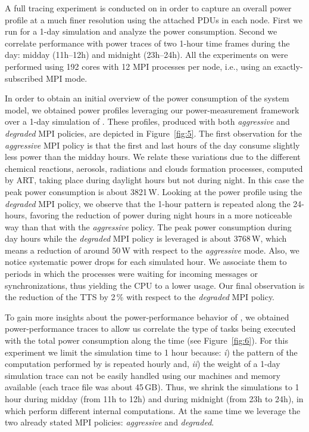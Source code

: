 A full tracing  experiment is conducted on \tinto  in order to capture
an overall power profile at a much finer resolution using the attached
PDUs in each  node. First we run \cosmoart for  a 1-day simulation and
analyze the  power consumption.  Second we  correlate performance with
power  traces  of  two  1-hour  time frames  during  the  day:  midday
(11h--12h) and midnight (23h--24h). All the experiments on \tinto were performed
using 192 cores with 12 MPI processes per node, i.e., using an exactly-subscribed MPI mode.

In order to obtain an initial overview of the power consumption of the
system  model,  we  obtained  power  profiles  leveraging  our  \pmlib
power-measurement    framework   over    a    1-day   simulation    of
\cosmoart. These profiles, produced with both \emph{aggressive} and \emph{degraded} MPI
policies,  are depicted in  Figure~\ref{fig:5}. The  first observation
for the \emph{aggressive} MPI policy is that the first and last hours of the day
consume slightly less  power than the midday hours.  We relate these
variations  due   to  the  different   chemical  reactions,  aerosols,
radiations  and clouds  formation processes,  computed by  ART, taking
place during  daylight hours  but not during  night. In this  case the
peak power consumption is about  3821\,W. Looking at the power profile
using the \emph{degraded}  MPI policy, we observe that  the 1-hour pattern is
repeated along  the 24-hours, favoring  the reduction of  power during
night  hours in  a  more noticeable  way  than that  with the   \emph{aggressive}
policy.   The peak  power consumption  during day  hours  while the
 \emph{degraded}  MPI policy  is leveraged  is  about 3768\,W,  which means  a
reduction of around  50\,W with respect to the  \emph{aggressive} mode. Also, we
notice systematic  power drops for each simulated  hour.  We associate
them  to periods  in  which  the processes  were waiting  for
incoming messages  or synchronizations, thus  yielding the CPU  to a lower
usage. Our final observation is the reduction of the TTS by 2\,\% with
respect to the  \emph{degraded} MPI policy.

To  gain  more  insights   about  the  power-performance  behavior  of
\cosmoart,  we  obtained power-per\-for\-man\-ce  traces  to allow  us
correlate  the type  of  tasks  being executed  with  the total  power
consumption  along  the   time  (see  Figure~\ref{fig:6}).   For  this
experiment we  limit the simulation  time to 1 hour  because: \emph{i})
the  pattern of  the computation  performed by  \cosmoart  is repeated
hourly and, \emph{ii}) the weight  of a 1-day simulation trace can not
be easily handled using our  machines and memory available (each trace
file was about 45\,GB). Thus, we shrink the simulations
to 1 hour during midday (from 11h  to 12h) and during
midnight  (from 23h  to  24h), in  which  \cosmoart perform  different
internal computations.  At  the same time we leverage  the two already
stated MPI policies: \emph{aggressive} and \emph{degraded}.

